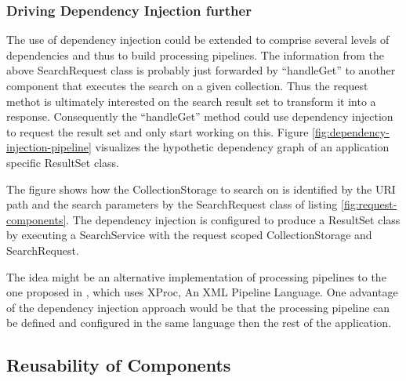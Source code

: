 \documentclass[12pt,a4paper,twoside]{scrartcl}		%
\begin{document}
\subsubsection{Driving Dependency Injection further}

The use of dependency injection could be extended to comprise several levels of
dependencies and thus to build processing pipelines.  The information from the
above SearchRequest class is probably just forwarded by ``handleGet'' to another
component that executes the search on a given collection. Thus the request
methot is ultimately interested on the search result set to transform it into a
response. Consequently the ``handleGet'' method could use dependency injection
to request the result set and only start working on this. Figure
\ref{fig:dependency-injection-pipeline} visualizes the hypothetic dependency
graph of an application specific ResultSet class.

The figure shows how the CollectionStorage to search on is identified by the URI
path and the search parameters by the SearchRequest class of listing
\ref{fig:request-components}. The dependency injection is configured to produce
a ResultSet class by executing a SearchService with the request scoped
CollectionStorage and SearchRequest.

The idea might be an alternative implementation of processing pipelines to the
one proposed in \cite{Davis:2011:XTR:1967428.1967437}, which uses XProc, An XML
Pipeline Language. One advantage of the dependency injection approach would be
that the processing pipeline can be defined and configured in the same language
then the rest of the application.






\subsection{Reusability of Components}
\label{sec:reus-comp}

\end{document}
